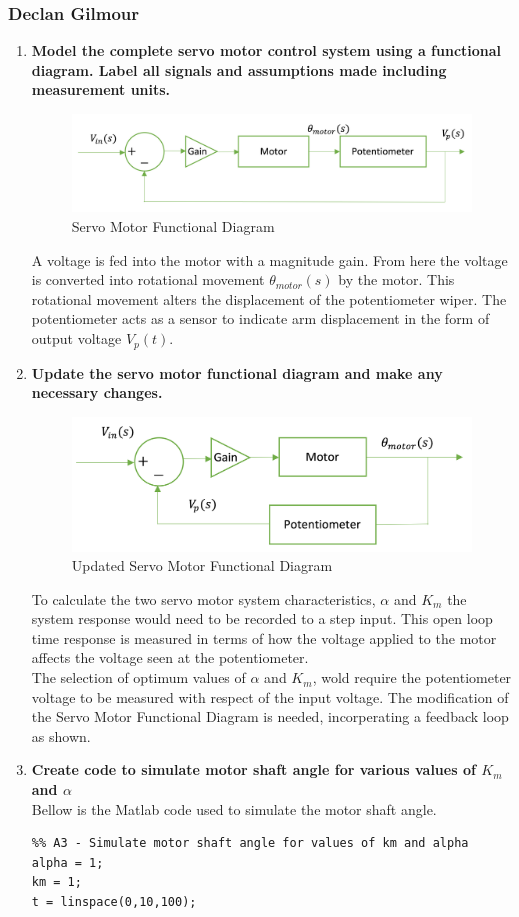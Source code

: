 \documentclass[11pt,a4paper]{article}
\begin{document}
\subsubsection{Declan Gilmour}
\begin{enumerate}
	\item \textbf{Model the complete servo motor control system using a functional diagram. Label all signals and assumptions made including measurement units.}
	\begin{figure}[H]
	\centering
	\includegraphics[width=.8\textwidth]{PreDec/A1.png}
	\caption{\label{fig:rand}Servo Motor Functional Diagram}
	\end{figure} 
	A voltage is fed into the motor with a magnitude gain. From here the voltage is converted into rotational movement $\theta_{motor}(s)$ by the motor.
	This rotational movement alters the displacement of the potentiometer wiper. The potentiometer acts as a sensor to indicate arm displacement in the form of output voltage $V_p(t)$.
	\item\textbf{Update the servo motor functional diagram and make any necessary changes.}
	\begin{figure}[H]
	\centering
	\includegraphics[width=.8\textwidth]{PreDec/A2.png}
	\caption{\label{fig:rand}Updated Servo Motor Functional Diagram}
	\end{figure}
	To calculate the two servo motor system characteristics, $\alpha$ and $K_m$ the system response would need to be recorded to a step input. This open loop time response is measured in terms of how the voltage applied to the motor affects the voltage seen at the potentiometer.\\
	The selection of optimum values of $\alpha$ and $K_m$, wold require the potentiometer voltage to be measured with respect of the input voltage. The modification of the Servo Motor Functional Diagram is needed, incorperating a feedback loop as shown.  
\pagebreak
	\item\textbf{Create code to simulate motor shaft angle for various values of $K_m$ and $\alpha$}\\
	Bellow is the Matlab code used to simulate the motor shaft angle.
	\begin{lstlisting}
%% A3 - Simulate motor shaft angle for values of km and alpha
alpha = 1;
km = 1;
t = linspace(0,10,100);


\end{lstlisting}
\end{enumerate}
\end{document}
